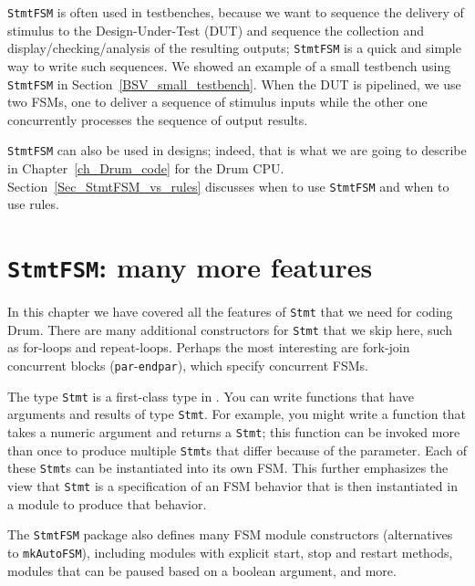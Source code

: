 
\verb|StmtFSM| is often used in testbenches, because we want to
sequence the delivery of stimulus to the Design-Under-Test (DUT) and
sequence the collection and display/checking/analysis of the resulting
outputs; \verb|StmtFSM| is a quick and simple way to write such
sequences.  We showed an example of a small testbench using
\verb|StmtFSM| in Section~\ref{BSV_small_testbench}.  When the DUT is
pipelined, we use two FSMs, one to deliver a sequence of stimulus
inputs while the other one concurrently processes the sequence of
output results.

\verb|StmtFSM| can also be used in designs; indeed, that is what we
are going to describe in Chapter~\ref{ch_Drum_code} for the Drum CPU.
Section~\ref{Sec_StmtFSM_vs_rules} discusses when to use
\verb|StmtFSM| and when to use rules.


\section{{\tt StmtFSM}: many more features}

\label{Sec_StmtFSM_more_features}


In this chapter we have covered all the features of \verb|Stmt| that
we need for coding Drum.  There are many additional constructors for
\verb|Stmt| that we skip here, such as for-loops and repeat-loops.
Perhaps the most interesting are fork-join concurrent blocks
(\verb|par|-\verb|endpar|), which specify concurrent FSMs.

The type \verb|Stmt| is a first-class type in {\BSV}.  You can write
functions that have arguments and results of type \verb|Stmt|.  For
example, you might write a function that takes a numeric argument and
returns a \verb|Stmt|; this function can be invoked more than once to
produce multiple \verb|Stmt|s that differ because of the parameter.
Each of these \verb|Stmt|s can be instantiated into its own FSM.  This
further emphasizes the view that \verb|Stmt| is a specification of an
FSM behavior that is then instantiated in a module to produce that
behavior.

The \verb|StmtFSM| package also defines many FSM module constructors
(alternatives to \verb|mkAutoFSM|), including modules with explicit
start, stop and restart methods, modules that can be paused based on a
boolean argument, and more.

